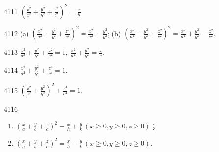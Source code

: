 
\begin{prob}[S]{4111}
$\displaystyle \left(\frac{x^2}{a^2}+\frac{y^2}{b^2}+\frac{z^2}{c^2}\right)^2 = \frac{x}{h}$.
\end{prob}

\begin{prob}[M]{4112}
(a) $\displaystyle \left(\frac{x^2}{a^2}+\frac{y^2}{b^2}+\frac{z^2}{c^2}\right)^2 = \frac{x^2}{a^2}+\frac{y^2}{b^2}$; \qquad
(b) $\displaystyle \left(\frac{x^2}{a^2}+\frac{y^2}{b^2}+\frac{z^2}{c^2}\right)^2 = \frac{x^2}{a^2}+\frac{y^2}{b^2}-\frac{z^2}{c^2}$.
\end{prob}

\begin{prob}[S]{4113}
$\displaystyle \frac{x^2}{a^2}+\frac{y^2}{b^2}+\frac{z^2}{c^2}=1,\ \frac{x^2}{a^2}+\frac{y^2}{b^2}=\frac{z}{c}$.
\end{prob}

\begin{prob}[S]{4114}
$\displaystyle \frac{x^2}{a^2}+\frac{y^2}{b^2}+\frac{z^4}{c^4}=1$.
\end{prob}

\begin{prob}[S]{4115}
$\displaystyle \left(\frac{x^2}{a^2}+\frac{y^2}{b^2}\right)^2+\frac{z^4}{c^4}=1$.
\end{prob}


\begin{prob}[M]{4116}
\begin{enumerate}[label=(\alph*), itemsep=2pt, topsep=3pt]
\item $\displaystyle \left(\frac{x}{a}+\frac{y}{b}+\frac{z}{c}\right)^2 = \frac{x}{h}+\frac{y}{k}\ (x \geqslant 0, y \geqslant 0, z \geqslant 0)$；
\item $\displaystyle \left(\frac{x}{a}+\frac{y}{b}+\frac{z}{c}\right)^2 = \frac{x}{h}-\frac{y}{k}\ (x \geqslant 0, y \geqslant 0, z \geqslant 0)$.
\end{enumerate}
\end{prob}


